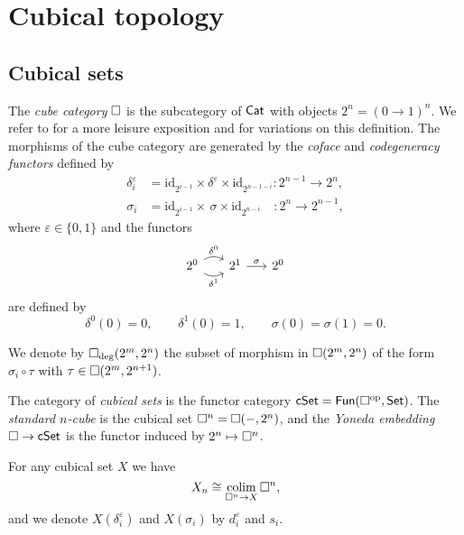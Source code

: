 
\section{Cubical topology} \label{s:cubical}

\subsection{Cubical sets}

The \textit{cube category} $\square$ is the subcategory of $\mathsf{Cat}$ with objects $2^n = (0 \to 1)^n$.
We refer to \cite{grandis2003cubical} for a more leisure exposition and for variations on this definition.
The morphisms of the cube category are generated by the \textit{coface} and \textit{codegeneracy functors} defined by
\begin{align*}
\delta_i^\varepsilon & = \mathrm{id}_{2^{i-1}} \times \delta^\varepsilon \times \mathrm{id}_{2^{n-1-i}} \colon 2^{n-1} \to 2^n, \\
\sigma_i & = \mathrm{id}_{2^{i-1}} \times \, \sigma \times \mathrm{id}_{2^{n-i}} \quad \colon 2^{n} \to 2^{n-1},
\end{align*}
where $\varepsilon \in \{0,1\}$ and the functors
\begin{equation*}
\begin{tikzcd} [column sep=16pt]
2^0 \arrow[r, bend left, "\delta^0"] \arrow[r, bend right, "\delta^1"'] & 2^1 \arrow[r, "\sigma"] & 2^0
\end{tikzcd}
\end{equation*}
are defined by
\begin{equation*}
\delta^0(0) = 0, \qquad \delta^1(0) = 1, \qquad \sigma(0) = \sigma(1) = 0.
\end{equation*}

We denote by $\square_{\deg}(2^m, 2^n)$ the subset of morphism in $\square(2^m, 2^n)$ of the form $\sigma_i \circ \tau$ with $\tau \in \square(2^m, 2^{n+1})$.

The category of \textit{cubical sets} is the functor category $\mathsf{cSet} = \mathsf{Fun}(\square^{\mathrm{op}}, \mathsf{Set})$.
The \textit{standard $n$-cube} is the cubical set $\square^n = \square(-, 2^n)$, and the \textit{Yoneda embedding} $\square \to \mathsf{cSet}$ is the functor induced by $2^n \mapsto \square^n$.

For any cubical set $X$ we have
\begin{equation*}
X_n \cong \operatorname*{colim}_{\square^n \to X} \square^n,
\end{equation*}
and we denote $X(\delta_i^\varepsilon)$ and $X(\sigma_i)$ by $d_i^\varepsilon$ and $s_i$.


